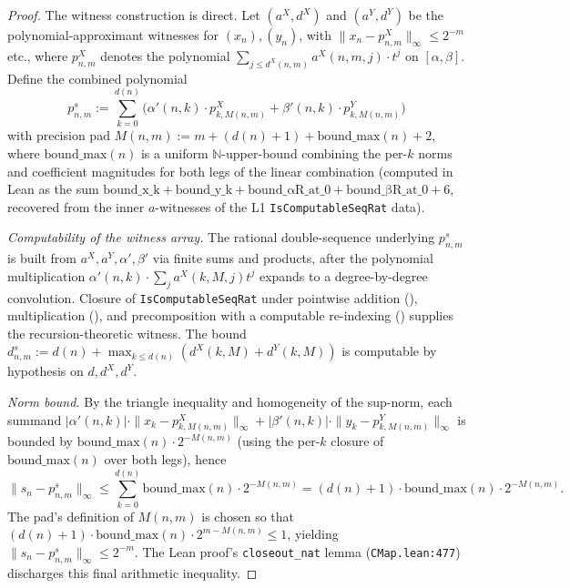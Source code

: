 \begin{proof}
  \leanok
  The witness construction is direct. Let $(a^X, d^X)$ and $(a^Y, d^Y)$ be the polynomial-approximant witnesses for $(x_n), (y_n)$, with $\|x_n - p^X_{n,m}\|_\infty \le 2^{-m}$ etc., where $p^X_{n,m}$ denotes the polynomial $\sum_{j \le d^X(n,m)} a^X(n,m,j) \cdot t^j$ on $[\alpha,\beta]$. Define the combined polynomial
  \[ p^s_{n,m} := \sum_{k=0}^{d(n)} \bigl( \alpha'(n,k) \cdot p^X_{k, M(n,m)} + \beta'(n,k) \cdot p^Y_{k, M(n,m)} \bigr) \]
  with precision pad $M(n,m) := m + (d(n) + 1) + \mathrm{bound\_max}(n) + 2$, where $\mathrm{bound\_max}(n)$ is a uniform $\mathbb{N}$-upper-bound combining the per-$k$ norms and coefficient magnitudes for both legs of the linear combination (computed in Lean as the sum $\mathrm{bound\_x\_k} + \mathrm{bound\_y\_k} + \mathrm{bound\_\alpha R\_at\_0} + \mathrm{bound\_\beta R\_at\_0} + 6$, recovered from the inner $a$-witnesses of the L1 \texttt{IsComputableSeqRat} data).

  \emph{Computability of the witness array.} The rational double-sequence underlying $p^s_{n,m}$ is built from $a^X, a^Y, \alpha', \beta'$ via finite sums and products, after the polynomial multiplication $\alpha'(n,k) \cdot \sum_j a^X(k,M,j) t^j$ expands to a degree-by-degree convolution. Closure of \texttt{IsComputableSeqRat} under pointwise addition (), multiplication (), and precomposition with a computable re-indexing () supplies the recursion-theoretic witness. The bound $d^s_{n,m} := d(n) + \max_{k \le d(n)}(d^X(k,M) + d^Y(k,M))$ is computable by hypothesis on $d, d^X, d^Y$.

  \emph{Norm bound.} By the triangle inequality and homogeneity of the sup-norm, each summand $|\alpha'(n,k)| \cdot \|x_k - p^X_{k,M(n,m)}\|_\infty + |\beta'(n,k)| \cdot \|y_k - p^Y_{k,M(n,m)}\|_\infty$ is bounded by $\mathrm{bound\_max}(n) \cdot 2^{-M(n,m)}$ (using the per-$k$ closure of $\mathrm{bound\_max}(n)$ over both legs), hence
  \[ \|s_n - p^s_{n,m}\|_\infty \le \sum_{k=0}^{d(n)} \mathrm{bound\_max}(n) \cdot 2^{-M(n,m)} = (d(n) + 1) \cdot \mathrm{bound\_max}(n) \cdot 2^{-M(n,m)}. \]
  The pad's definition of $M(n,m)$ is chosen so that $(d(n)+1) \cdot \mathrm{bound\_max}(n) \cdot 2^{m - M(n,m)} \le 1$, yielding $\|s_n - p^s_{n,m}\|_\infty \le 2^{-m}$. The Lean proof's \texttt{closeout\_nat} lemma (\texttt{CMap.lean:477}) discharges this final arithmetic inequality.
\end{proof}

